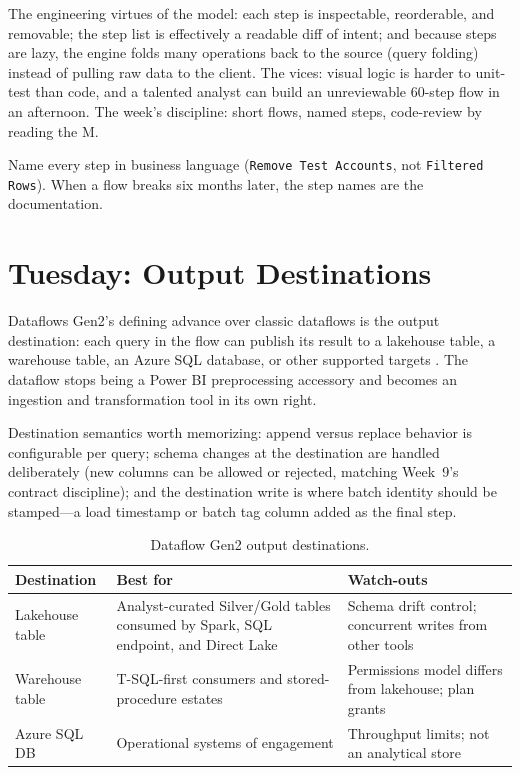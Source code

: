 The engineering virtues of the model: each step is inspectable, reorderable, and removable; the step list is effectively a readable diff of intent; and because steps are lazy, the engine folds many operations back to the source (query folding) instead of pulling raw data to the client. The vices: visual logic is harder to unit-test than code, and a talented analyst can build an unreviewable 60-step flow in an afternoon. The week's discipline: short flows, named steps, code-review by reading the M.

\begin{tipbox}
Name every step in business language (\texttt{Remove Test Accounts}, not \texttt{Filtered Rows}). When a flow breaks six months later, the step names are the documentation.
\end{tipbox}

\section{Tuesday: Output Destinations}
Dataflows Gen2's defining advance over classic dataflows is the output destination: each query in the flow can publish its result to a lakehouse table, a warehouse table, an Azure SQL database, or other supported targets \cite{microsoftFabricDataflows}. The dataflow stops being a Power BI preprocessing accessory and becomes an ingestion and transformation tool in its own right.

Destination semantics worth memorizing: append versus replace behavior is configurable per query; schema changes at the destination are handled deliberately (new columns can be allowed or rejected, matching Week~9's contract discipline); and the destination write is where batch identity should be stamped---a load timestamp or batch tag column added as the final step.

\begin{table}[H]
\centering
\small
\begin{tabular}{@{}p{3.4cm}p{5.2cm}p{5.2cm}@{}}
\toprule
\textbf{Destination} & \textbf{Best for} & \textbf{Watch-outs} \\
\midrule
Lakehouse table & Analyst-curated Silver/Gold tables consumed by Spark, SQL endpoint, and Direct Lake & Schema drift control; concurrent writes from other tools \\
Warehouse table & T-SQL-first consumers and stored-procedure estates & Permissions model differs from lakehouse; plan grants \\
Azure SQL DB & Operational systems of engagement & Throughput limits; not an analytical store \\
\bottomrule
\end{tabular}
\caption{Dataflow Gen2 output destinations.}
\label{tab:chapter10-destinations}
\end{table}

